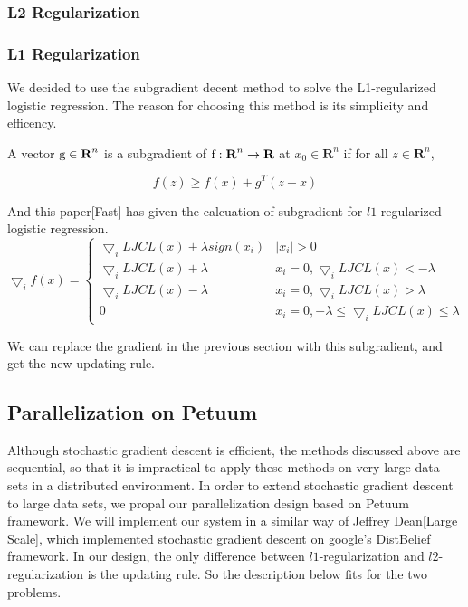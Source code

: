 \documentclass{article} %
\begin{document}
\subsubsection{L2 Regularization}



\subsubsection{L1 Regularization}
We decided to use the subgradient decent method to solve the L1-regularized logistic regression. The reason for choosing this method is its simplicity and efficency.

A vector $\textup{g} \in \textbf{R}^n$ is a subgradient of $\textup{f}:\textbf{R}^n \rightarrow \textbf{R}$ at $x_0 \in \textbf{R}^n$ if for all $z \in \textbf{R}^n$,

\begin{equation}
f(z) \ge f(x) + g^T(z-x)
\end{equation}

And this paper[Fast] has given the calcuation of subgradient for $l1$-regularized logistic regression.
\begin{equation}
\bigtriangledown_if(x) = \left\{\begin{matrix}
\bigtriangledown_iLJCL(x) + \lambda sign(x_i) & |x_i| > 0\\ 
\bigtriangledown_iLJCL(x) + \lambda & x_i=0,\bigtriangledown_iLJCL(x)<-\lambda\\ 
\bigtriangledown_iLJCL(x) - \lambda & x_i=0,\bigtriangledown_iLJCL(x)>\lambda\\ 
0 & x_i=0, -\lambda \le \bigtriangledown_iLJCL(x) \le \lambda
\end{matrix}\right.
\end{equation}

We can replace the gradient in the previous section with this subgradient, and get the new updating rule.

\subsection{Parallelization on Petuum}
Although stochastic gradient descent is efficient, the methods discussed above are sequential, so that it is impractical to apply these methods on very large data sets in a distributed environment. In order to extend stochastic gradient descent to large data sets, we propal our parallelization design based on Petuum framework. We will implement our system in a similar way of Jeffrey Dean[Large Scale], which implemented stochastic gradient descent on google's DistBelief framework. In our design, the only difference between $l1$-regularization and $l2$-regularization is the updating rule. So the description below fits for the two problems. 
\end{document}
